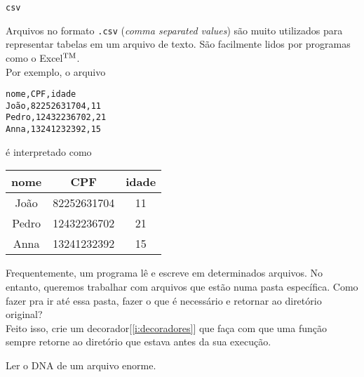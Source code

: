 	\begin{interlude}{\texttt{csv}}
	
	Arquivos no formato \texttt{.csv} (\textit{comma separated values}) são muito utilizados para representar tabelas em um arquivo de texto. São facilmente lidos por programas como o Excel$^{\tiny \text{TM}}$.\\
	
	Por exemplo, o arquivo
	
	\begin{lstlisting}
nome,CPF,idade
João,82252631704,11
Pedro,12432236702,21
Anna,13241232392,15
	\end{lstlisting}
	
	é interpretado como
	
	\begin{center}
	\begin{tabular}{|c|c|c|}
	\hline
	nome  & CPF         & idade\\
	\hline 
	João  & 82252631704 &11\\
	\hline
	Pedro & 12432236702 &21\\
	\hline
	Anna  & 13241232392 &15\\
	\hline
	\end{tabular}
	\end{center}
	
	\end{interlude}
	
	
	Frequentemente, um programa lê e escreve em determinados arquivos. No entanto, queremos trabalhar com arquivos que estão numa pasta específica. Como fazer pra ir até essa pasta, fazer o que é necessário e retornar ao diretório original?\\
	
	\quest Feito isso, crie um decorador[\ref{i:decoradores}] que faça com que uma função sempre retorne ao diretório que estava antes da sua execução.
	
	\label{p:dna2}
	
	Ler o DNA de um arquivo enorme.